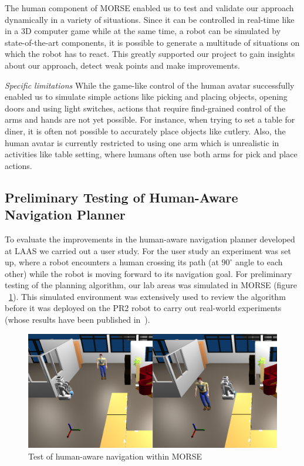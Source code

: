 \documentclass[conference]{IEEEtran}
\begin{document}
The human component of MORSE enabled us to test and validate our approach
dynamically in a variety of situations. Since it can be controlled in real-time
like in a 3D computer game while at the same time, a robot can be simulated by
state-of-the-art components, it is possible to generate a multitude of
situations on which the robot has to react. This greatly supported our project
to gain insights about our approach, detect weak points and make improvements.

\emph{Specific limitations} While the game-like control of the human avatar 
successfully enabled us to simulate simple actions like picking and placing objects, 
opening doors and using light switches, actions that require find-grained control 
of the arms and hands are not yet possible. For instance, when trying to set a table for 
diner, it is often not possible to accurately place objects like cutlery. Also, the human
avatar is currently restricted to using one arm which is unrealistic in activities 
like table setting, where humans often use both arms for pick and place actions.
 

\subsection{Preliminary Testing of Human-Aware Navigation Planner}
\label{sc:navigation}

To evaluate the improvements in the human-aware navigation planner developed at
LAAS we carried out a user study. For the user study an experiment was set up,
where a robot encounters a human crossing its path (at $90^{\circ }$ angle to
each other) while the robot is moving forward to its navigation goal. For
preliminary testing of the planning algorithm, our lab areas was simulated in
MORSE (figure ~\ref{fig|hanp}). This simulated environment was extensively used
to review the algorithm before it was deployed on the PR2 robot to carry out
real-world experiments (whose results have been published
in~\cite{ThibaultKruse2014}).

\begin{figure}[H]
      \centering
      \includegraphics[width=0.9\linewidth]{morsehanp.png}
      \caption{Test of human-aware navigation within MORSE}
      \label{fig|hanp}
\end{figure}
\end{document}
